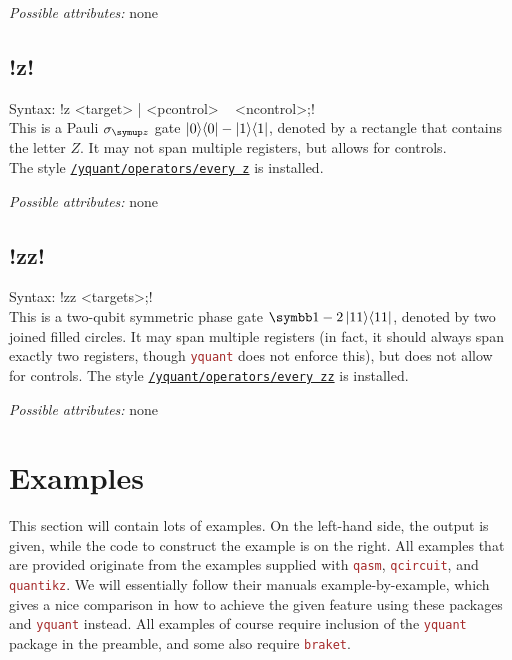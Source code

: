 \documentclass{scrartcl}
\def\pkg#1{\textcolor{brown}{\texttt{#1}}}
\def\style#1{\hyperref[style:#1]{\texttt{#1}}}
\def\Yquant{\pkg{yquant}}
\def\ketbra#1#2{\ket{#1}\!\bra{#2}}
\begin{document}
         \emph{Possible attributes:} none
      
      \subsection{\texorpdfstring{\yquant!z!}{z}}\label{gate:z}
         Syntax: \yquant!z <target> | <pcontrol> ~ <ncontrol>;! \\
         This is a Pauli $\sigma_{\symup z}$ gate $\ketbra00 - \ketbra11$, denoted by a rectangle that contains the letter $Z$.
         It may not span multiple registers, but allows for controls. \\
         The style \style{/yquant/operators/every z} is installed.
         
         \emph{Possible attributes:} none
         
      \subsection{\texorpdfstring{\yquant!zz!}{zz}}\label{gate:zz}
         Syntax: \yquant!zz <targets>;! \\
         This is a two\hyp qubit symmetric phase gate $\symbb1 - 2\ketbra{11}{11}$, denoted by two joined filled circles.
         It may span multiple registers (in fact, it should always span exactly two registers, though \Yquant{} does not enforce this), but does not allow for controls.
         The style \style{/yquant/operators/every zz} is installed.
         
         \emph{Possible attributes:} none
         
   
   \section{Examples}\label{sec:examples}
      This section will contain lots of examples.
      On the left\hyp hand side, the output is given, while the code to construct the example is on the right.
      All examples that are provided originate from the examples supplied with \pkg{qasm}, \pkg{qcircuit}, and \pkg{quantikz}.
      We will essentially follow their manuals example\hyp by\hyp example, which gives a nice comparison in how to achieve the given feature using these packages and \Yquant{} instead.
      All examples of course require inclusion of the \Yquant{} package in the preamble, and some also require \pkg{braket}.
      
\end{document}
